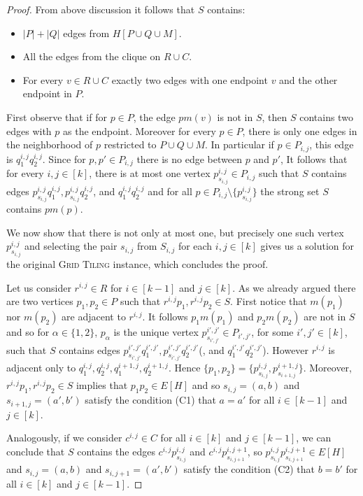 \begin{proof}
From above discussion it follows that $S$ contains:
\begin{itemize}
\item $|P|+|Q|$ edges from $H[P\cup Q\cup M]$.
\item All the edges from the clique on $R\cup C$. 
\item For every $v\in R\cup C$ exactly two edges with one endpoint $v$ and the other endpoint in $P$.
\end{itemize} 
First observe that if for $p\in P$, the edge $pm(v)$ is not in $S$, then $S$ contains two edges with $p$ as the endpoint. Moreover for every $p\in P$, there is only one edges in the neighborhood of $p$ restricted to $P\cup Q\cup M$. In particular if $p\in P_{i,j}$, this edge is $q^{i,j}_1q^{i,j}_2$. Since for $p, p'\in P_{i,j}$ there is no edge between $p$ and $p'$, It follows that for every $i,j\in [k]$, there is at most one vertex $p^{i,j}_{s_{i,j}}\in P_{i,j}$ such that $S$ contains edges $p^{i,j}_{s_{i,j}}q_1^{i,j}, p^{i,j}_{s_{i,j}}q_2^{i,j}$, and $q_1^{i,j}q_2^{i,j}$ and for all $p \in  P_{i,j}\setminus \{p^{i,j}_{s_{i,j}}\}$ the strong set $S$ contains $pm(p)$. 

We now show that there is not only at most one, but precisely one such vertex $p^{i,j}_{s_{i,j}}$ and selecting the pair $s_{i,j}$ from $S_{i,j}$ for each $i,j\in [k]$ gives us a solution for the original \textsc{Grid Tiling} instance, which concludes the proof. 

Let us consider $r^{i,j}\in R$ for $i\in [k-1]$ and $j\in [k]$. As we already argued there are two vertices $p_1,p_2\in P$ such that $r^{i,j}p_1, r^{i,j}p_2\in S$. First notice that $m(p_1)$ nor $m(p_2)$ are adjacent to $r^{i,j}$. It follows $p_1m(p_1)$ and $p_2m(p_2)$ are not in $S$ and so for $\alpha\in \{1,2\}$, $p_\alpha$ is the unique vertex $p^{i',j'}_{s_{i',j'}}\in P_{i',j'}$, for some $i',j'\in [k]$, such that $S$ contains edges $p^{i',j'}_{s_{i',j'}}q_1^{i',j'}, p^{i',j'}_{s_{i',j'}}q_2^{i',j'}$(, and $q_1^{i',j'}q_2^{i',j'}$). However $r^{i,j}$ is adjacent only to $q_1^{i,j}, q_2^{i,j}, q_1^{i+1,j}, q_2^{i+1,j}$. Hence $\{p_1, p_2\} = \{p^{i,j}_{s_{i,j}}, p^{i+1,j}_{s_{i+1,j}}\}$. Moreover, $r^{i,j}p_1, r^{i,j}p_2\in S$ implies that $p_1p_2\in E[H]$ and so $s_{i,j}=(a,b)$ and $s_{i+1,j}=(a',b')$ satisfy the condition (C1) that $a=a'$ for all $i\in [k-1]$ and $j\in [k]$.

Analogously, if we consider $c^{i,j}\in C$ for all $i\in [k]$ and $j\in [k-1]$, we can conclude that $S$ contains the edges $c^{i,j}p^{i,j}_{s_{i,j}}$ and $c^{i,j}p^{i,j+1}_{s_{i,j+1}}$, so $p^{i,j}_{s_{i,j}}p^{i,j+1}_{s_{i,j+1}}\in E[H]$ and $s_{i,j}=(a,b)$ and $s_{i,j+1}=(a',b')$ satisfy the condition (C2) that $b=b'$ for all $i\in [k]$ and $j\in [k-1]$.
\end{proof}

